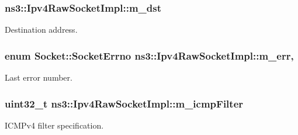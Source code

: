 \subsubsection[{\texorpdfstring{m\+\_\+dst}{m_dst}}]{ ns3\+::\+Ipv4\+Raw\+Socket\+Impl\+::m\+\_\+dst\hspace{0.3cm}{\ttfamily [private]}}\hypertarget{classns3_1_1Ipv4RawSocketImpl_a36a7c8ea8152272b055706247b97bef2}{}\label{classns3_1_1Ipv4RawSocketImpl_a36a7c8ea8152272b055706247b97bef2}


Destination address. 

\subsubsection[{\texorpdfstring{m\+\_\+err}{m_err}}]{\setlength{\rightskip}{0pt plus 5cm}enum {\bf Socket\+::\+Socket\+Errno} ns3\+::\+Ipv4\+Raw\+Socket\+Impl\+::m\+\_\+err\hspace{0.3cm}{\ttfamily [mutable]}, {\ttfamily [private]}}\hypertarget{classns3_1_1Ipv4RawSocketImpl_aae08c8798140ad6193ad2fc7ab1efbed}{}\label{classns3_1_1Ipv4RawSocketImpl_aae08c8798140ad6193ad2fc7ab1efbed}


Last error number. 

\subsubsection[{\texorpdfstring{m\+\_\+icmp\+Filter}{m_icmpFilter}}]{\setlength{\rightskip}{0pt plus 5cm}uint32\+\_\+t ns3\+::\+Ipv4\+Raw\+Socket\+Impl\+::m\+\_\+icmp\+Filter\hspace{0.3cm}{\ttfamily [private]}}\hypertarget{classns3_1_1Ipv4RawSocketImpl_ab80bb1194c37a7489b342156a7bfcb92}{}\label{classns3_1_1Ipv4RawSocketImpl_ab80bb1194c37a7489b342156a7bfcb92}


I\+C\+M\+Pv4 filter specification. 

